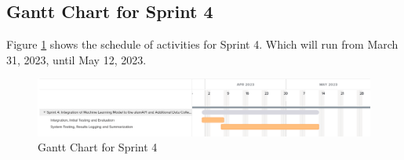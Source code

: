 \subsection{Gantt Chart for Sprint 4}
\label{subsec:gantt_chart_sprint4}
Figure \ref{fig:gantt_chart_sprint4} shows the schedule of activities for Sprint 4. 
Which will run from March 31, 2023, until May 12, 2023.
\begin{figure}[ht]
    \centering
    \includegraphics[width=1\textwidth]{./assets/Chapter_3/Gantt/Gantt_Chart_Sprint4.png}
    \caption{Gantt Chart for Sprint 4}
    \label{fig:gantt_chart_sprint4}
\end{figure}
\FloatBarrier